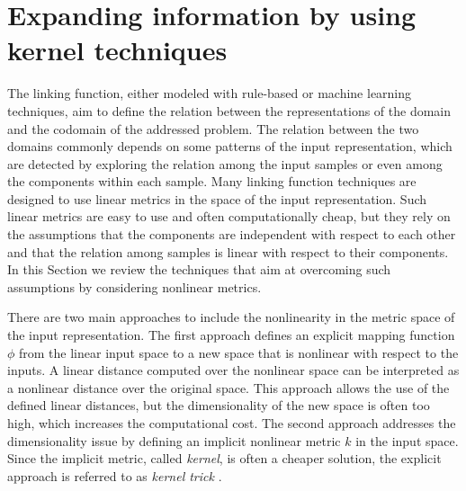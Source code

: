 \section{Expanding information by using kernel techniques}\label{sec:ML:kernels}
The linking function, either modeled with rule-based or machine learning techniques, aim to define the relation between the representations of the domain and the codomain of the addressed problem. The relation between the two domains commonly depends on some patterns of the input representation, which are detected by exploring the relation among the input samples or even among the components within each sample. Many linking function techniques are designed to use linear metrics in the space of the input representation. Such linear metrics are easy to use and often computationally cheap, but they rely on the assumptions that the components are independent with respect to each other and that the relation among samples is linear with respect to their components. In this Section we review the techniques that aim at overcoming such assumptions by considering nonlinear metrics.


There are two main approaches to include the nonlinearity in the metric space of the input representation. The first approach defines an explicit mapping function $\phi$ from the linear input space to a new space that is nonlinear with respect to the inputs. A linear distance computed over the nonlinear space can be interpreted as a nonlinear distance over the original space. This approach allows the use of the defined linear distances, but the dimensionality of the new space is often too high, which increases the computational cost. The second approach addresses the dimensionality issue by defining an implicit nonlinear metric $k$ in the input space. Since the implicit metric, called \textit{kernel}, is often a cheaper solution, the explicit approach is referred to as \textit{kernel trick} \cite{Smola2004}. 

